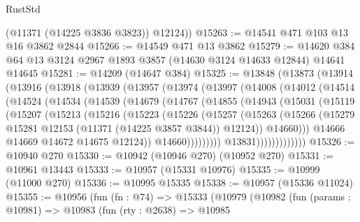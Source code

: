 \begin{lexlean}{RustStd}
\begin{coremodule}
        (@11371 (@14225 @3836 @3823))
        @12124))
@15263 := @14541 @471 @103 @13 @16 @3862 @2844
@15266 := @14549 @471 @13 @3862
@15279 := @14620 @384 @64 @13 @3124 @2967 @1893 @3857 (@14630 @3124 @14633 @12844) @14641 @14645
@15281 := @14209 (@14647 @384)
@15325 := @13848
    (@13873
      (@13914
        (@13916
          (@13918
            (@13939
              (@13957
                (@13974
                  (@13997
                    (@14008
                      (@14012
                        (@14514
                          (@14524
                            (@14534
                              (@14539
                                (@14679
                                  (@14767
                                    (@14855
                                      (@14943
                                        (@15031
                                          (@15119
                                            (@15207
                                              (@15213
                                                (@15216
                                                  (@15223
                                                    (@15226
                                                      (@15257
                                                        (@15263
                                                          (@15266
                                                            (@15279
                                                              @15281
                                                              @12153
                                                              (@11371 (@14225 @3857 @3844))
                                                              @12124))
                                                          @14660)))
                                                    @14666
                                                    @14669
                                                    @14672
                                                    @14675
                                                    @12124))
                                                @14660)))))))))
                              @13831)))))))))))))
@15326 := @10940 @270
@15330 := @10942 (@10946 @270) (@10952 @270)
@15331 := @10961 @13443
@15333 := @10957 (@15331 @10976)
@15335 := @10999 (@11000 @270)
@15336 := @10995 @15335
@15338 := @10957 (@15336 @11024)
@15355 := @10956
    (fun (fn : @74) =>
    @15333
      (@10979
        (@10982
          (fun (params : @10981) =>
          @10983
            (fun (rty : @2638) =>
            @10985

\end{coremodule}
\end{lexlean}
